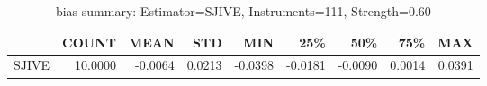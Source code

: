 \begin{table}[ht]
\centering
\caption{bias summary: Estimator=SJIVE, Instruments=111, Strength=0.60}
\begin{tabular}{lrrrrrrrr}
\toprule
 & COUNT & MEAN & STD & MIN & 25\% & 50\% & 75\% & MAX \\
\midrule
SJIVE & 10.0000 & -0.0064 & 0.0213 & -0.0398 & -0.0181 & -0.0090 & 0.0014 & 0.0391 \\
\bottomrule
\end{tabular}
\end{table}
